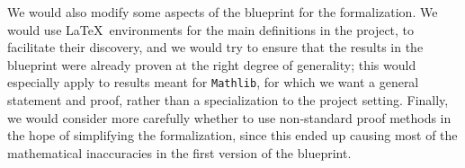 \documentclass[12pt, reqno]{amsart}
\newcommand{\mathlib}{\texttt{Mathlib}\xspace}
\theoremstyle{definition}
\theoremstyle{plain}
\begin{document}
We would also modify some aspects of the blueprint for the formalization.
We would use \LaTeX\ environments for the main definitions in the project,
to facilitate their discovery,
and we would try to ensure that the results in the blueprint were already proven at the right degree of generality;
this would especially apply to results meant for \mathlib, for which we want a general statement and proof,
rather than a specialization to the project setting.
Finally, we would consider more carefully whether to use non-standard proof methods in the hope of simplifying the formalization,
since this ended up causing most of the mathematical inaccuracies in the first version of the blueprint.


\printbibliography
\end{document}
